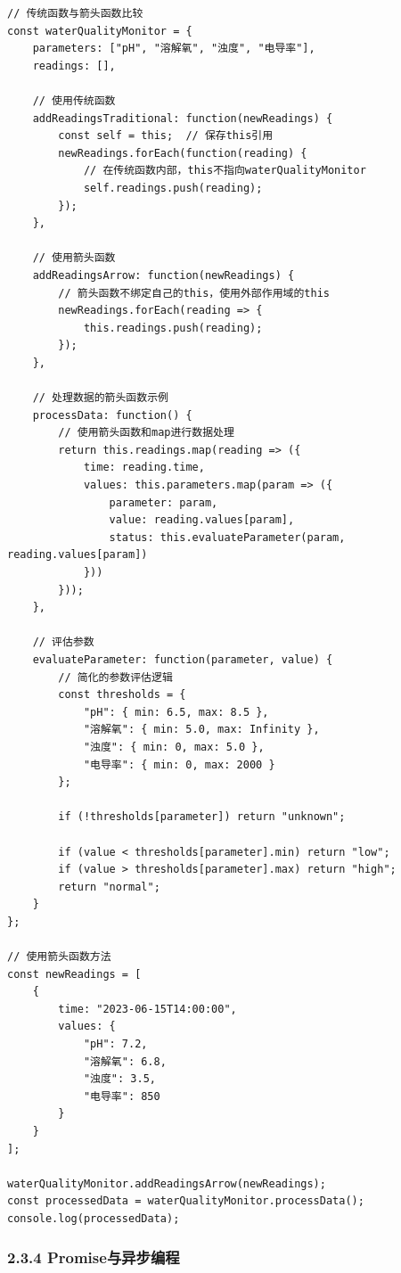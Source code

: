 \begin{lstlisting}
// 传统函数与箭头函数比较
const waterQualityMonitor = {
    parameters: ["pH", "溶解氧", "浊度", "电导率"],
    readings: [],
    
    // 使用传统函数
    addReadingsTraditional: function(newReadings) {
        const self = this;  // 保存this引用
        newReadings.forEach(function(reading) {
            // 在传统函数内部，this不指向waterQualityMonitor
            self.readings.push(reading);
        });
    },
    
    // 使用箭头函数
    addReadingsArrow: function(newReadings) {
        // 箭头函数不绑定自己的this，使用外部作用域的this
        newReadings.forEach(reading => {
            this.readings.push(reading);
        });
    },
    
    // 处理数据的箭头函数示例
    processData: function() {
        // 使用箭头函数和map进行数据处理
        return this.readings.map(reading => ({
            time: reading.time,
            values: this.parameters.map(param => ({
                parameter: param,
                value: reading.values[param],
                status: this.evaluateParameter(param, reading.values[param])
            }))
        }));
    },
    
    // 评估参数
    evaluateParameter: function(parameter, value) {
        // 简化的参数评估逻辑
        const thresholds = {
            "pH": { min: 6.5, max: 8.5 },
            "溶解氧": { min: 5.0, max: Infinity },
            "浊度": { min: 0, max: 5.0 },
            "电导率": { min: 0, max: 2000 }
        };
        
        if (!thresholds[parameter]) return "unknown";
        
        if (value < thresholds[parameter].min) return "low";
        if (value > thresholds[parameter].max) return "high";
        return "normal";
    }
};

// 使用箭头函数方法
const newReadings = [
    {
        time: "2023-06-15T14:00:00",
        values: {
            "pH": 7.2,
            "溶解氧": 6.8,
            "浊度": 3.5,
            "电导率": 850
        }
    }
];

waterQualityMonitor.addReadingsArrow(newReadings);
const processedData = waterQualityMonitor.processData();
console.log(processedData);
\end{lstlisting}

\subsubsection{2.3.4
Promise与异步编程}\label{promiseux4e0eux5f02ux6b65ux7f16ux7a0b}


